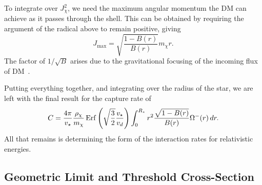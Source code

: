 To integrate over $J^2_\chi$, we need the maximum angular momentum the DM can achieve as it passes through the shell. This can be obtained by requiring the argument of the radical above to remain positive, giving
\begin{equation}
    J_\mathrm{max} = \sqrt{\frac{1 - B(r)}{B(r)}} m_\chi r.
\end{equation}
The factor of $1/\sqrt{B}$ arises due to the gravitational focusing of the incoming flux of DM~\cite{Kouvaris:2007ay_WIMPAnnihilationCooling}.

Putting everything together, and integrating over the radius of the star, we are left with the final result for the capture rate of
\begin{equation}
    C =\frac{4\pi}{v_\star}\frac{\rho_\chi}{m_\chi} {\rm \,Erf}\left(\sqrt{\frac{3}{2}}\frac{v_\star}{v_d}\right) \int_0^{R_\star}  r^2\frac{\sqrt{1 - B(r)}}{B(r)}\Omega^-(r)\,dr.
    \label{ch3:eq:cap_rel_full_1}
\end{equation}
All that remains is determining the form of the interaction rates for relativistic energies.


\subsection{Geometric Limit and Threshold Cross-Section}
\label{ch3:subsec:geom_lim_threshold_xs}

